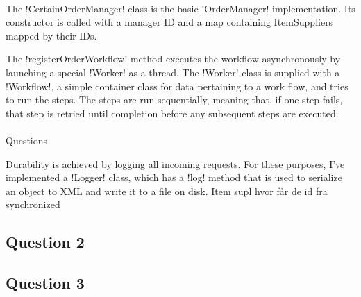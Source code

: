 \documentclass[a4paper, 12pt]{article}
\begin{document}
\paragraph{}

The !CertainOrderManager! class is the basic !OrderManager!
implementation. Its constructor is called with a manager ID and a map
containing ItemSuppliers mapped by their IDs.

The !registerOrderWorkflow! method executes the workflow
asynchronously by launching a special !Worker! as a thread. The
!Worker! class is supplied with a !Workflow!, a simple container class
for data pertaining to a work flow, and tries to run the steps. The
steps are run sequentially, meaning that, if one step fails, that step
is retried until completion before any subsequent steps are executed.

\paragraph{}

Questions

Durability is achieved by logging all incoming requests. For these
purposes, I've implemented a !Logger! class, which has a !log! method
that is used to serialize an object to XML and write it to a file on
disk. Item supl
hvor får de id fra
synchronized



\subsection*{Question 2}






\subsection*{Question 3}

\end{document}

